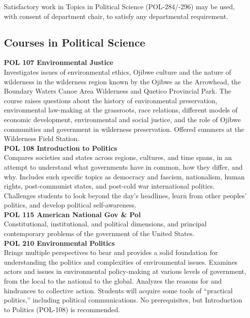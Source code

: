 \documentclass[
  letterpaper,
]{scrbook}
\begin{document}
Satisfactory work in Topics in Political Science (POL-284/-296) may be
used, with consent of department chair, to satisfy any departmental
requirement.

\subsection{Courses in Political
Science}\label{courses-in-political-science}

\textbf{POL 107 Environmental Justice}\\
Investigates issues of environmental ethics, Ojibwe culture and the
nature of wilderness in the wilderness region known by the Ojibwe as the
Arrowhead, the Boundary Waters Canoe Area Wilderness and Quetico
Provincial Park. The course raises questions about the history of
environmental preservation, environmental law-making at the grassroots,
race relations, different models of economic development, environmental
and social justice, and the role of Ojibwe communities and government in
wilderness preservation. Offered summers at the Wilderness Field
Station.\\
\textbf{POL 108 Introduction to Politics}\\
Compares societies and states across regions, cultures, and time spans,
in an attempt to understand what governments have in common, how they
differ, and why. Includes such specific topics as democracy and fascism,
nationalism, human rights, post-communist states, and post-cold war
international politics. Challenges students to look beyond the day's
headlines, learn from other peoples' politics, and develop political
self-awareness.\\
\textbf{POL 115 American National Gov \& Pol}\\
Constitutional, institutional, and political dimensions, and principal
contemporary problems of the government of the United States.\\
\textbf{POL 210 Environmental Politics}\\
Brings multiple perspectives to bear and provides a solid foundation for
understanding the politics and complexities of environmental issues.
Examines actors and issues in environmental policy-making at various
levels of government, from the local to the national to the global.
Analyzes the reasons for and hindrances to collective action. Students
will acquire some tools of ``practical politics,'' including political
communications. No prerequisites, but Introduction to Politics (POL-108)
is recommended.\\
\end{document}
